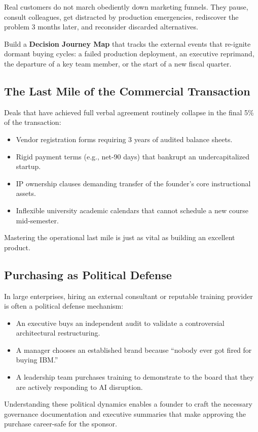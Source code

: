 Real customers do not march obediently down marketing funnels. They pause, consult colleagues, get distracted by production emergencies, rediscover the problem 3 months later, and reconsider discarded alternatives.

Build a \textbf{Decision Journey Map} that tracks the external events that re-ignite dormant buying cycles: a failed production deployment, an executive reprimand, the departure of a key team member, or the start of a new fiscal quarter.

\subsection{The Last Mile of the Commercial Transaction}

Deals that have achieved full verbal agreement routinely collapse in the final 5\% of the transaction:
\begin{itemize}[leftmargin=1.2em,itemsep=0.2ex]
  \item Vendor registration forms requiring 3 years of audited balance sheets.
  \item Rigid payment terms (e.g., net-90 days) that bankrupt an undercapitalized startup.
  \item IP ownership clauses demanding transfer of the founder's core instructional assets.
  \item Inflexible university academic calendars that cannot schedule a new course mid-semester.
\end{itemize}
Mastering the operational last mile is just as vital as building an excellent product.

\subsection{Purchasing as Political Defense}

In large enterprises, hiring an external consultant or reputable training provider is often a political defense mechanism:
\begin{itemize}[leftmargin=1.2em,itemsep=0.2ex]
  \item An executive buys an independent audit to validate a controversial architectural restructuring.
  \item A manager chooses an established brand because ``nobody ever got fired for buying IBM.''
  \item A leadership team purchases training to demonstrate to the board that they are actively responding to AI disruption.
\end{itemize}
Understanding these political dynamics enables a founder to craft the necessary governance documentation and executive summaries that make approving the purchase career-safe for the sponsor.

